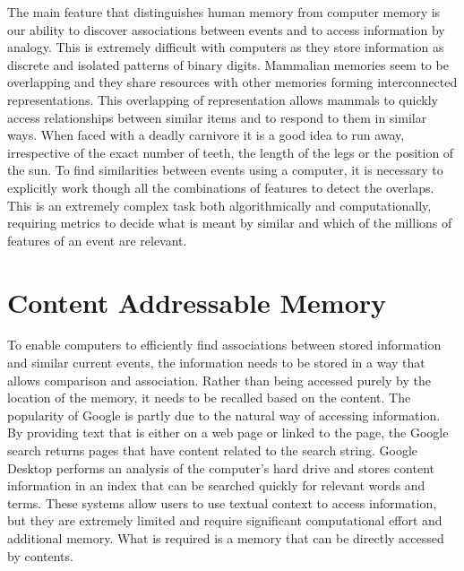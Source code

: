 The main feature that distinguishes human memory from computer memory is our ability to discover associations between events and to access information by analogy.  This is extremely difficult with computers as they store information as discrete and isolated patterns of binary digits.  Mammalian memories seem to be overlapping and they share resources with other memories forming interconnected representations.  This overlapping of representation allows mammals to quickly access relationships between similar items and to respond to them in similar ways.  When faced with a deadly carnivore it is a good idea to run away, irrespective of the exact number of teeth, the length of the legs or the position of the sun.  To find similarities between events using a computer, it is necessary to explicitly work though all the combinations of features to detect the overlaps.  This is an extremely complex task both algorithmically and computationally, requiring metrics to decide what is meant by similar and which of the millions of features of an event are relevant.

\section{Content Addressable Memory}

To enable computers to efficiently find associations between stored information and similar current events, the information needs to be stored in a way that allows comparison and association.  Rather than being accessed purely by the location of the memory, it needs to be recalled based on the content.  The popularity of Google is partly due to the natural way of accessing information.  By providing text that is either on a web page or linked to the page, the Google search returns pages that have content related to the search string.  Google Desktop performs an analysis of the computer's hard drive and stores content information in an index that can be searched quickly for relevant words and terms.  These systems allow users to use textual context to access information, but they are extremely limited and require significant computational effort and additional memory.  What is required is a memory that can be directly accessed by contents.

